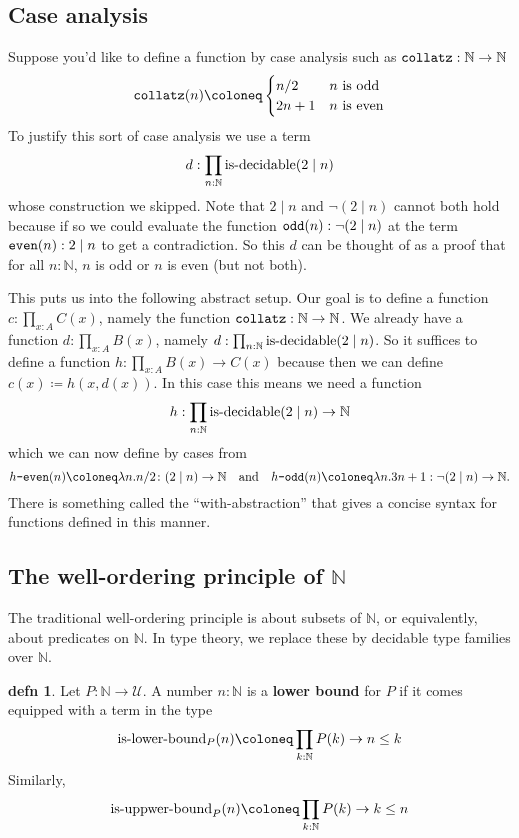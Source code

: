 \documentclass{amsart}
\theoremstyle{theorem}
\theoremstyle{definition}
\newtheorem*{defn}{defn}
\theoremstyle{remark}
\newcommand{\0}{\mathbbe{0}}
\newcommand{\1}{\mathbbe{1}}
\newcommand{\2}{\mathbbe{2}}
\newcommand{\3}{\mathbbe{3}}
\newcommand{\4}{\mathbbe{4}}
\newcommand{\term}[1]{{\textup{\texttt{#1}}}}
\newcommand{\type}[1]{{\textup{#1}}}
\newcommand{\bN}{{\mathbb{N}}}
\newcommand{\UU}{{\mathcal{U}}}
\begin{document}
\subsection*{Case analysis}

Suppose you'd like to define a function by case analysis such as $\term{collatz} : \bN \to \bN$
\[ \term{collatz}(n) \coloneq \begin{cases} n/2 & n\ \text{is~odd} \\ 2n+1 & n\ \text{is~even} \end{cases}\]
To justify this sort of case analysis we use a term
\[ d : \prod_{n : \bN} \type{is-decidable} (2 \mid n)\]
whose construction we skipped. Note that $2 \mid n$ and $\neg(2 \mid n)$ cannot both hold because if so we could evaluate the function $\term{odd}(n) : \neg(2 \mid n)$ at the term $\term{even}(n) : 2 \mid n$ to get a contradiction. So this $d$ can be thought of as a proof that for all $n : \bN$, $n$ is odd or $n$ is even (but not both).

This puts us into the following abstract setup. Our goal is to define a function $c : \prod_{x :A} C(x)$, namely the function $\term{collatz} : \bN \to \bN$. We already have a function $d : \prod_{x :A} B(x)$, namely $d : \prod_{n : \bN} \type{is-decidable}(2 \mid n)$. So it suffices to define a function $h : \prod_{x:A} B(x) \to C(x)$ because then we can define $c(x) \coloneq h(x,d(x))$. In this case this means we need a function
\[ h : \prod_{n : \bN} \type{is-decidable} (2 \mid n) \to \bN\] which we can now define by cases from
\[ h\term{-even}(n) \coloneq \lambda n. n/2 \colon (2 \mid n) \to \bN \quad \text{and} \quad h\term{-odd}(n) \coloneq \lambda n. 3n+1 : \neg(2 \mid n) \to \bN.\]
There is something called the ``with-abstraction'' that gives a concise syntax for functions defined in this manner.

\subsection*{The well-ordering principle of $\bN$}

The traditional well-ordering principle is about subsets of $\bN$, or equivalently, about predicates on $\bN$. In type theory, we replace these by decidable type families over $\bN$.

\begin{defn} Let $P \colon \bN \to \UU$. A number $n : \bN$ is a \textbf{lower bound} for $P$ if it comes equipped with a term in the type
  \[ \type{is-lower-bound}_{P}(n) \coloneq \prod_{k : \bN} P(k) \to n \leq k\]
  Similarly,
  \[ \type{is-uppwer-bound}_{P}(n) \coloneq \prod_{k : \bN} P(k) \to k \leq n\]
  \end{defn}
\end{document}
